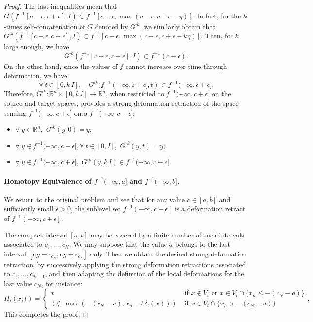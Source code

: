 \documentclass[11pt]{article}
\newcommand{\R}{\mathbb{R}}
\newcommand{\eps}{\epsilon}
\newcommand{\inter}{\cap}
\newcommand{\level}[2]{{#1}^{-1}\left({#2}\right)}
\newcommand{\sublevel}[2]{{#1}^{-1}\left(-\infty, {#2}\right]}
\theoremstyle{plain}
\theoremstyle{definition}
\theoremstyle{remark}
\begin{document}
\begin{proof}
	The last inequalities mean that $G( f^{-1}[c-\eps, c+\eps], I ) \subset f^{-1}[c-\eps, \max(c-\eps,c+\eps - \eta)]$.
	In fact, for the $k$-times self-concatenation of $G$ denoted by $G^{\square k}$, we similarly obtain that $G^{\square k}( f^{-1}[c-\eps, c+\eps], I ) \subset f^{-1}[c-\eps,\max(c-\eps, c+\eps - k\eta)]$. Then, for $k$ large enough, we have
	\[G^{\square k}( f^{-1}[c-\eps, c+\eps], I ) \subset \level{f}{c-\eps}.\]
	On the other hand, since the values of $f$ cannot increase over time through deformation, we have
	\[\forall\ t \in [0, k \, I], \quad G^{\square k}(f^{-1}(-\infty, c+\eps], t) \subset f^{-1}(-\infty, c+\eps].\]
	Therefore, $G^{\square k} : \R^n \times [0, k \, I] \to \R^n$, when restricted to $f^{-1}(-\infty, c+\eps]$ on the source and target spaces, provides a strong deformation retraction of the space sending $f^{-1}(-\infty, c+\eps]$ onto $f^{-1}(-\infty, c-\eps]$:
	\begin{itemize}
	\item $\forall\ y \in \R^n$,\, $G^{\square k}(y, 0) = y$;
	\item $\forall\ y \in f^{-1}(-\infty, c-\eps], \forall\ t \in [0, I]$,\, $G^{\square k}(y, t) = y$;
	\item $\forall\ y \in f^{-1}(-\infty, c+\eps]$,\, $G^{\square k}(y, k\,I) \in f^{-1}(-\infty, c-\eps]$.
	\end{itemize}

\paragraph{Homotopy Equivalence of $f^{-1}(-\infty, a]$ and $f^{-1}(-\infty, b]$.}

We return to the original problem and see that for any value $c \in [a,b]$ and sufficiently small $\epsilon > 0$, the sublevel set $\sublevel{f}{c-\epsilon}$ is a deformation retract of $\sublevel{f}{c+\epsilon}$.

The compact interval $[a,b]$ may be covered by a finite number of such intervals associated to $c_1, \ldots, c_N$. We may suppose that the value $a$ belongs to the last interval $[c_N-\eps_{c_N}, c_N+ \eps_{c_N}]$ only. Then we obtain the desired strong deformation retraction, by successively applying the strong deformation retractions associated to $c_1, \ldots, c_{N-1}$, and then adapting the definition of the local deformations for the last value $c_N$, for instance:
	\[ H_i(x,t) =
\begin{cases}
	x & \text{ if } x \notin V_i \text{ or } x \in V_i \inter \{x_n \leq -(c_N - a)\} \\
	(\zeta,\, \max(-(c_N - a), x_n - t \, \delta_i(x) )) & \text{ if } x \in V_i \inter \{x_n > -(c_N - a)\}
\end{cases}.
\]
This completes the proof.\end{proof}
\end{document}
